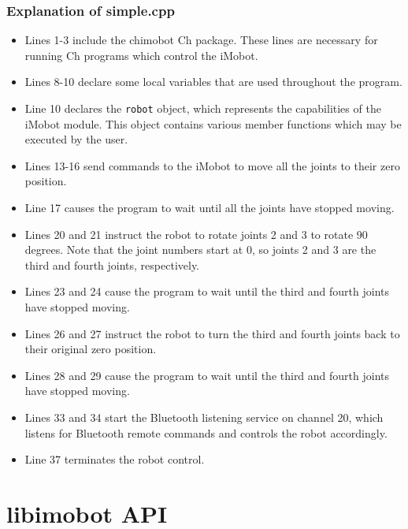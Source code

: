 \documentclass[11pt]{report}
\begin{document}
\subsection{Explanation of simple.cpp}
\begin{itemize}
\item Lines 1-3 include the chimobot Ch package. These lines are necessary for
running Ch programs which control the iMobot. 
\item Lines 8-10 declare some local variables that are used throughout the program.
\item Line 10 declares the \texttt{robot} object, which represents the
capabilities of the iMobot module. This object contains various member
functions which may be executed by the user.
\item Lines 13-16 send commands to the iMobot to move all the joints to their
zero position.
\item Line 17 causes the program to wait until all the joints have stopped moving. 
\item Lines 20 and 21 instruct the robot to rotate joints 2 and 3 to rotate 90
degrees. Note that the joint numbers start at 0, so joints 2 and 3 are the
third and fourth joints, respectively. 
\item Lines 23 and 24 cause the program to wait until the third and fourth
joints have stopped moving.
\item Lines 26 and 27 instruct the robot to turn the third and fourth joints
back to their original zero position.
\item Lines 28 and 29 cause the program to wait until the third and fourth
joints have stopped moving.
\item Lines 33 and 34 start the Bluetooth listening service on channel 20,
which listens for Bluetooth remote commands and controls the robot accordingly. 
\item Line 37 terminates the robot control.
\end{itemize}

\appendix
\chapter{libimobot API}

\pagebreak

{}
\printindex
\end{document}
